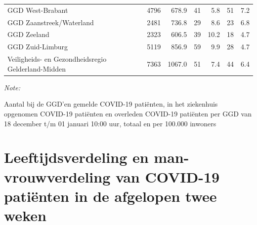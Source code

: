 \documentclass[
  english,
  man,floatsintext]{apa6}
\begin{document}
\begin{table}[H]
\begin{threeparttable}
\begin{tabular}{lrrrrrr}
GGD West-Brabant & 4796 & 678.9 & 41 & 5.8 & 51 & 7.2\\
GGD Zaanstreek/Waterland & 2481 & 736.8 & 29 & 8.6 & 23 & 6.8\\
GGD Zeeland & 2323 & 606.5 & 39 & 10.2 & 18 & 4.7\\
GGD Zuid-Limburg & 5119 & 856.9 & 59 & 9.9 & 28 & 4.7\\
Veiligheids- en Gezondheidsregio Gelderland-Midden & 7363 & 1067.0 & 51 & 7.4 & 44 & 6.4\\
\bottomrule
\end{tabular}
\begin{tablenotes}
\item \textit{Note: } 
\item Aantal bij de GGD’en gemelde COVID-19 patiënten, in het ziekenhuis opgenomen COVID-19 patiënten en overleden COVID-19 patiënten per GGD van 18 december t/m 01 januari 10:00 uur, totaal en per 100.000 inwoners
\end{tablenotes}
\end{threeparttable}
\endgroup{}
\end{table}

\newpage

\hypertarget{leeftijdsverdeling-en-man-vrouwverdeling-van-covid-19-patiuxebnten-in-de-afgelopen-twee-weken}{%
\section{Leeftijdsverdeling en man-vrouwverdeling van COVID-19 patiënten in de afgelopen twee weken}\label{leeftijdsverdeling-en-man-vrouwverdeling-van-covid-19-patiuxebnten-in-de-afgelopen-twee-weken}}
\end{document}
